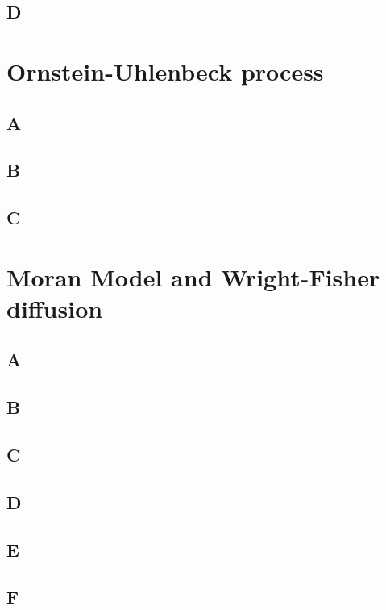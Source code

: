 \documentclass{article}
\begin{document}
\subsection{D}

\section{Ornstein-Uhlenbeck process}

\subsection{A}

\subsection{B}

\subsection{C}

\section{Moran Model and Wright-Fisher diffusion}

\subsection{A}

\subsection{B}

\subsection{C}

\subsection{D}

\subsection{E}

\subsection{F}
\end{document}
